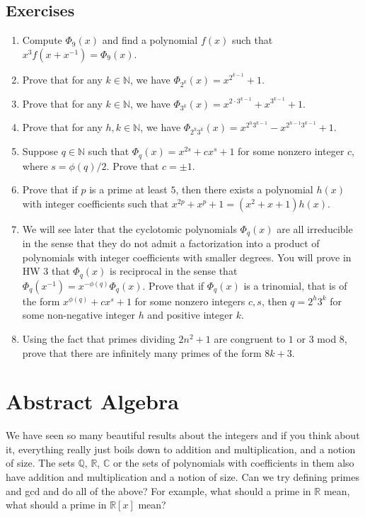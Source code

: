 \documentclass{article}
\def\R{{\mathbb R}}
\def\N{{\mathbb N}}
\def\Q{{\mathbb Q}}
\def\Q{{\mathbb Q}}
\def\C{{\mathbb C}}
\begin{document}
\subsection*{Exercises}
\begin{enumerate}[\thesection .1]
    \item Compute $\Phi_9(x)$ and find a polynomial $f(x)$ such that $x^3f(x + x^{-1}) = \Phi_9(x)$.
    \item Prove that for any $k\in\N$, we have $\Phi_{2^k}(x) = x^{2^{k-1}}+1$.
    \item Prove that for any $k\in\N$, we have $\Phi_{3^k}(x) = x^{2\cdot 3^{k-1}}+x^{3^{k-1}} + 1$.
    \item Prove that for any $h,k\in\N$, we have $\Phi_{2^h3^k}(x) = x^{2^h 3^{k-1}}-x^{2^{h-1}3^{k-1}} + 1$.
    \item Suppose $q\in\N$ such that $\Phi_q(x) = x^{2s} + cx^s + 1$ for some nonzero integer $c$, where $s = \phi(q)/2$. Prove that $c = \pm1$.
    \item Prove that if $p$ is a prime at least $5$, then there exists a polynomial $h(x)$ with integer coefficients such that $x^{2p} + x^p + 1 = (x^2 + x + 1)h(x).$
    \item We will see later that the cyclotomic polynomials $\Phi_q(x)$ are all irreducible in the sense that they do not admit a factorization into a product of polynomials with integer coefficients with smaller degrees. You will prove in HW 3 that $\Phi_q(x)$ is reciprocal in the sense that $\Phi_q(x^{-1}) = x^{-\phi(q)}\Phi_q(x).$ Prove that if $\Phi_q(x)$ is a trinomial, that is of the form $x^{\phi(q)} + cx^s + 1$ for some nonzero integers $c,s$, then $q = 2^h3^k$ for some non-negative integer $h$ and positive integer $k$.
    \item Using the fact that primes dividing $2n^2 + 1$ are congruent to $1$ or $3$ mod $8$, prove that there are infinitely many primes of the form $8k+3$.
    
\end{enumerate}


\section{Abstract Algebra}

We have seen so many beautiful results about the integers and if you think about it, everything really just boils down to addition and multiplication, and a notion of size. The sets $\Q$, $\R$, $\C$ or the sets of polynomials with coefficients in them also have addition and multiplication and a notion of size. Can we try defining primes and gcd and do all of the above? For example, what should a prime in $\R$ mean, what should a prime in $\R[x]$ mean?
\end{document}
